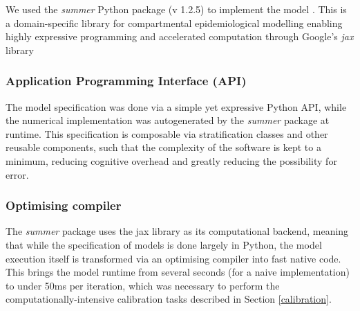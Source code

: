 
We used the \textit{summer} Python package (v 1.2.5) to implement the model \cite{summer2024}. This is a domain-specific library for 
compartmental epidemiological modelling enabling highly expressive programming and accelerated computation through Google’s \textit{jax} library

\subsubsection{Application Programming Interface (API)}
The model specification was done via a simple yet expressive Python API, 
while the numerical implementation was autogenerated by the \textit{summer} package at runtime. 
This specification is composable via stratification classes and other reusable components, 
such that the complexity of the software is kept to a minimum, reducing cognitive overhead and greatly reducing the possibility for error.

\subsubsection{Optimising compiler}
The \textit{summer} package uses the jax library as its computational backend, meaning that while the specification of models is done largely in Python, 
the model execution itself is transformed via an optimising compiler into fast native code.
This brings the model runtime from several seconds (for a naive implementation) to under 50ms per iteration, which was necessary to perform the computationally-intensive
calibration tasks described in Section \ref{calibration}.




